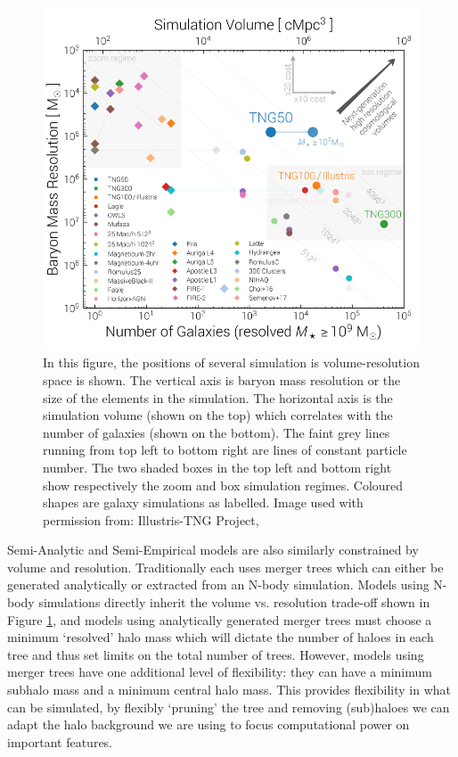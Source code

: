 \begin{figure}[h]
    \centering
    \includegraphics[width = \linewidth]{Figures/Chapter2/VolumeResolutionComparison.png}
    \caption{In this figure, the positions of several simulation is volume-resolution space is shown. The vertical axis is baryon mass resolution or the size of the elements in the simulation. The horizontal axis is the simulation volume (shown on the top) which correlates with the number of galaxies (shown on the bottom). The faint grey lines running from top left to bottom right are lines of constant particle number. The two shaded boxes in the top left and bottom right show respectively the zoom and box simulation regimes. Coloured shapes are galaxy simulations as labelled. 
    Image used with permission from: Illustris-TNG Project, \citet{Nelson2019FirstFeedback}}
    \label{fig:Vol_v_Res}
\end{figure}

Semi-Analytic and Semi-Empirical models are also similarly constrained by volume and resolution. Traditionally each uses merger trees which can either be generated analytically or extracted from an N-body simulation. Models using N-body simulations directly inherit the volume vs. resolution trade-off shown in Figure \ref{fig:Vol_v_Res}, and models using analytically generated merger trees must choose a minimum `resolved' halo mass which will dictate the number of haloes in each tree and thus set limits on the total number of trees. However, models using merger trees have one additional level of flexibility: they can have a minimum subhalo mass and a minimum central halo mass. This provides flexibility in what can be simulated, by flexibly `pruning' the tree and removing (sub)haloes we can adapt the halo background we are using to focus computational power on important features. 

